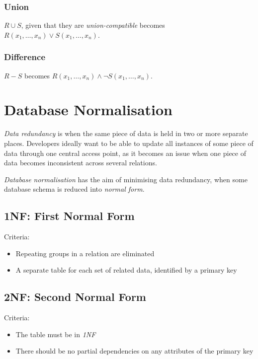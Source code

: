 \documentclass{article}
\begin{document}
\subsubsection{Union}

$R \cup S$, given that they are \textit{union-compatible} becomes $R(x_1, \ldots, x_n) \vee S(x_1, \ldots, x_n)$.

\subsubsection{Difference}

$R - S$ becomes $R(x_1, \ldots, x_n) \wedge \neg S(x_1, \ldots, x_n)$.

\section{Database Normalisation}

\textit{Data redundancy} is when the same piece of data is held in two or more separate places. Developers ideally want to be able to update all instances of some piece of data through one central access point, as it becomes an issue when one piece of data becomes inconsistent across several relations.

\textit{Database normalisation} has the aim of minimising data redundancy, when some database schema is reduced into \textit{normal form}.

\subsection{1NF: First Normal Form}

Criteria:

\begin{itemize}
  \item Repeating groups in a relation are eliminated
  \item A separate table for each set of related data, identified by a primary key
\end{itemize}

\subsection{2NF: Second Normal Form}

Criteria:

\begin{itemize}
\item
  The table must be in \textit{1NF}
\item
  There should be no partial dependencies on any attributes of the primary key
\end{itemize}
\end{document}
